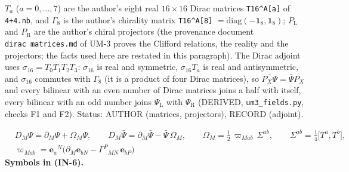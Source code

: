 \documentclass[
  10pt,
]{article}
\begin{document}
\(T_a\) (\(a = 0, \dots, 7\)) are the author's eight real
\(16 \times 16\) Dirac matrices \texttt{T16\^{}A{[}a{]}} of
\texttt{4+4.nb}, and \(\Gamma_8\) is the author's chirality matrix
\texttt{T16\^{}A{[}8{]}}
\(= \mathrm{diag}(-\mathbf{1}_8, \mathbf{1}_8)\); \(P_{\mathrm{L}}\) and
\(P_{\mathrm{R}}\) are the author's chiral projectors (the provenance
document \texttt{dirac\ matrices.md} of UM-3 proves the Clifford
relations, the reality and the projectors; the facts used here are
restated in this paragraph). The Dirac adjoint uses
\(\sigma_{16} = T_0T_1T_2T_3\): \(\sigma_{16}\) is real and symmetric,
\(\sigma_{16}T_a\) is real and antisymmetric, and \(\sigma_{16}\)
commutes with \(\Gamma_8\) (it is a product of four Dirac matrices), so
\(\overline{P_X\Psi} = \bar\Psi P_X\) and every bilinear with an even
number of Dirac matrices joins a half with itself, every bilinear with
an odd number joins \(\Psi_{\mathrm{L}}\) with \(\Psi_{\mathrm{R}}\)
(DERIVED, \texttt{um3\_fields.py}, checks F1 and F2). Status: AUTHOR
(matrices, projectors), RECORD (adjoint).

\[
\begin{aligned}
&D_M\Psi = \partial_M\Psi + \Omega_M\Psi,\qquad D_M\bar\Psi = \partial_M\bar\Psi - \bar\Psi\,\Omega_M,\qquad
 \Omega_M = \frac12\,\varpi_{Mab}\,\Sigma^{ab},\qquad \Sigma^{ab} = \frac14\big[T^a, T^b\big],\\
&\varpi_{Mab} = \mathbf{e}_a{}^N\big(\partial_M\mathbf{e}_{bN} - \Gamma^P{}_{MN}\,\mathbf{e}_{bP}\big)
\end{aligned} \tag{IN-6}
\] \textbf{Symbols in (IN-6).}
\end{document}
